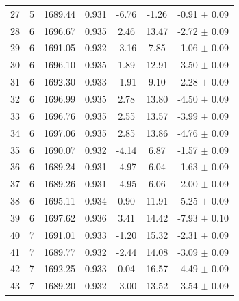 \begin{longtable}{c c c c c c c}
    27 & 5 & 1689.44 & 0.931 & \cellcolor{aicyellow}-6.76 & -1.26 & -0.91 $\pm$ 0.09 \\
    28 & 6 & 1696.67 & 0.935 & \cellcolor{aiclightorange}2.46 & \cellcolor{aicred}13.47 & \cellcolor{aicorange}-2.72 $\pm$ 0.09 \\
    29 & 6 & 1691.05 & 0.932 & \cellcolor{aiclightyellow}-3.16 & \cellcolor{aiclightred}7.85 & \cellcolor{aicorange}-1.06 $\pm$ 0.09 \\
    30 & 6 & 1696.10 & 0.935 & 1.89 & \cellcolor{aicred}12.91 & \cellcolor{aiclightred}-3.50 $\pm$ 0.09 \\
    31 & 6 & 1692.30 & 0.933 & -1.91 & \cellcolor{aiclightred}9.10 & \cellcolor{aicorange}-2.28 $\pm$ 0.09 \\
    32 & 6 & 1696.99 & 0.935 & \cellcolor{aiclightorange}2.78 & \cellcolor{aicred}13.80 & \cellcolor{aiclightred}-4.50 $\pm$ 0.09 \\
    33 & 6 & 1696.76 & 0.935 & \cellcolor{aiclightorange}2.55 & \cellcolor{aicred}13.57 & \cellcolor{aiclightred}-3.99 $\pm$ 0.09 \\
    34 & 6 & 1697.06 & 0.935 & \cellcolor{aiclightorange}2.85 & \cellcolor{aicred}13.86 & \cellcolor{aiclightred}-4.76 $\pm$ 0.09 \\
    35 & 6 & 1690.07 & 0.932 & \cellcolor{aicyellow}-4.14 & \cellcolor{aiclightred}6.87 & \cellcolor{aicorange}-1.57 $\pm$ 0.09 \\
    36 & 6 & 1689.24 & 0.931 & \cellcolor{aicyellow}-4.97 & \cellcolor{aiclightred}6.04 & \cellcolor{aicorange}-1.63 $\pm$ 0.09 \\
    37 & 6 & 1689.26 & 0.931 & \cellcolor{aicyellow}-4.95 & \cellcolor{aiclightred}6.06 & \cellcolor{aicorange}-2.00 $\pm$ 0.09 \\
    38 & 6 & 1695.11 & 0.934 & 0.90 & \cellcolor{aicred}11.91 & \cellcolor{aicred}-5.25 $\pm$ 0.09 \\
    39 & 6 & 1697.62 & 0.936 & \cellcolor{aiclightorange}3.41 & \cellcolor{aicred}14.42 & \cellcolor{aicred}-7.93 $\pm$ 0.10 \\
    40 & 7 & 1691.01 & 0.933 & -1.20 & \cellcolor{aicred}15.32 & \cellcolor{aicorange}-2.31 $\pm$ 0.09 \\
    41 & 7 & 1689.77 & 0.932 & \cellcolor{aiclightyellow}-2.44 & \cellcolor{aicred}14.08 & \cellcolor{aiclightred}-3.09 $\pm$ 0.09 \\
    42 & 7 & 1692.25 & 0.933 & 0.04 & \cellcolor{aicred}16.57 & \cellcolor{aiclightred}-4.49 $\pm$ 0.09 \\
    43 & 7 & 1689.20 & 0.932 & \cellcolor{aiclightyellow}-3.00 & \cellcolor{aicred}13.52 & \cellcolor{aiclightred}-3.54 $\pm$ 0.09 \\

\end{longtable}
